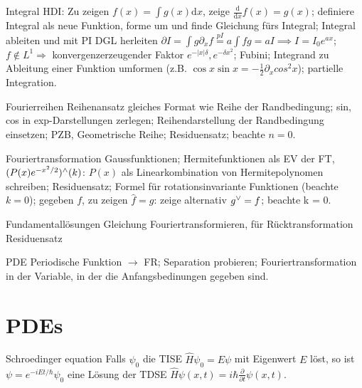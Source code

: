 \begin{namedtheorem}{Integral}
HDI: Zu zeigen $f(x) = \int g(x) \mathrm{d}x$, zeige $\frac{\mathrm{d}}{\mathrm{d}x}f(x) = g(x)$; \enspace definiere Integral als neue Funktion, forme um und finde Gleichung fürs Integral; \enspace Integral ableiten und mit PI DGL herleiten $\partial I = \int g \partial_x f \overset{pI}{=} a \int f g = aI \implies I=I_0e^{ax}$; \enspace $f \notin L^1 \Rightarrow$ konvergenzerzeugender Faktor $e^{- |x| \delta}, e^{-\delta x^2}$; \enspace Fubini; \enspace Integrand zu Ableitung einer Funktion umformen (z.B. $\cos x \sin x = -\frac{1}{2}\partial_xcos^2x$); \enspace partielle Integration.
\end{namedtheorem}

\begin{namedtheorem}{Fourierreihen}
Reihenansatz gleiches Format wie Reihe der Randbedingung; \enspace sin, cos in exp-Darstellungen zerlegen; \enspace Reihendarstellung der Randbedingung einsetzen; \enspace PZB, Geometrische Reihe; \enspace Residuensatz; \enspace beachte $n = 0$.
\end{namedtheorem}

\begin{namedtheorem}{Fouriertransformation}
Gaussfunktionen; \enspace Hermitefunktionen als EV der FT, $(P(x)e^{-x^2/2}){}^{\wedge}(k)$: $P(x)$ als Linearkombination von Hermitepolynomen schreiben; \enspace Residuensatz; \enspace Formel für rotationsinvariante Funktionen (beachte $k = 0$); \enspace gegeben $f$, zu zeigen $\hat{f} = g$: zeige alternativ $g{}^{\vee} = f$; \enspace beachte k = 0.
\end{namedtheorem}

\begin{namedtheorem}{Fundamentallösungen}
Gleichung Fouriertransformieren, für Rücktransformation Residuensatz
\end{namedtheorem}

\begin{namedtheorem}{PDE}
Periodische Funktion $\rightarrow$ FR; \enspace Separation probieren; \enspace Fouriertransformation in der Variable, in der die Anfangsbedinungen gegeben sind.
\end{namedtheorem}

\section{PDEs}

\begin{namedtheorem}{Schroedinger equation}
Falls $\psi_0$ die TISE $\hat{H}\psi_0 = E\psi$ mit Eigenwert $E$ löst, so ist $\psi = e^{-iEt/\hbar}\psi_0$ eine Lösung der TDSE $\hat{H}\psi(x, t) = i\hbar \frac{\partial}{\partial t}\psi(x, t)$.
\end{namedtheorem}

